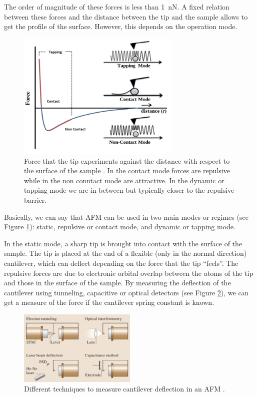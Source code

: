 \documentclass[11pt,a4paper]{article}
\begin{document}
The order of magnitude of these forces is less than \SI{1}{\nano\N}. A fixed relation between these forces and the distance between the tip and the sample allows to get the profile of the surface. However, this depends on the operation mode.

\begin{figure}[ht]
\centering
\includegraphics[width=0.7\textwidth]{AFM_modes}
\caption{Force that the tip experiments against the distance with respect to the surface of the sample \cite{jfb8010007}. In the contact mode forces are repulsive while in the non conntact mode are attractive. In the dynamic or tapping mode we are in between but typically closer to the repulsive barrier.}
\label{fig:AFM_modes}
\end{figure}

Basically, we can say that AFM can be used in two main modes or regimes (see Figure \ref{fig:AFM_modes}): static, repulsive or contact mode, and dynamic or tapping mode.

In the static mode, a sharp tip is brought into contact with the surface of the sample. The tip is placed at the end of a flexible (only in the normal direction) cantilever, which can deflect depending on the force that the tip ``feels''. The repulsive forces are due to electronic orbital overlap between the atoms of the tip and those in the surface of the sample. By measuring the deflection of the cantilever using tunneling, capacitive or optical detectors (see Figure \ref{fig:Deflection_measurement}), we can get a measure of the force if the cantilever spring constant is known.

\begin{figure}[ht]
\centering
\includegraphics[width=0.5\textwidth]{Deflection}
\caption{Different techniques to measure cantilever deflection in an AFM \cite{Bhushan}.}
\label{fig:Deflection_measurement}
\end{figure}
\end{document}
